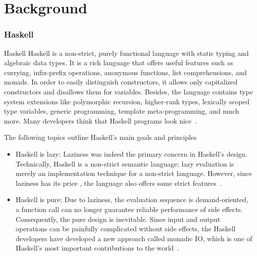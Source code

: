 
\newcommand{\importGQL}[2]{
       
}

\newcommand{\importHS}[2]{
       
}

\newcommand{\expr}[1]{\hspace{0.2mm}\mbox{\textcolor{green!35!blue!55!black}{\texttt{#1}}}}


\section{Background}

\begin{frame}\frametitle{Haskell}

    \footnotesize
    \begin{block}{Haskell}
        Haskell is a non-strict, purely functional language with static typing and algebraic data types. It is a rich language that offers useful features such as currying, infix-prefix operations, anonymous functions, list comprehensions, and monads. In order to easily distinguish constructors, it allows only capitalized constructors and disallows them for variables. Besides, the language contains type system extensions like polymorphic recursion, higher-rank types, lexically scoped type variables, generic programming, template meta-programming,  and much more. Many developers think that Haskell programs look nice~\cite{history-of-haskell}.
    \end{block}

    \begin{block}{The following topics outline Haskell's main goals and principles}
    
        \begin{itemize}
            \item Haskell is lazy: 
            Laziness was indeed the primary concern in Haskell's design. Technically, Haskell is a non-strict semantic language; lazy evaluation is merely an implementation technique for a non-strict language.  However, since laziness has its price 
            , the language also offers some strict features~\cite{history-of-haskell}.
    
            \item Haskell is pure: Due to laziness, the evaluation sequence is demand-oriented, a function call can no longer guarantee reliable performance of side effects. Consequently, the pure design is inevitable. Since input and output operations can be painfully complicated without side effects, the Haskell developers have developed a new approach called monadic IO, which is one of Haskell's most important contributions to the world~\cite{history-of-haskell}.
        \end{itemize}

    \end{block}

\end{frame}

